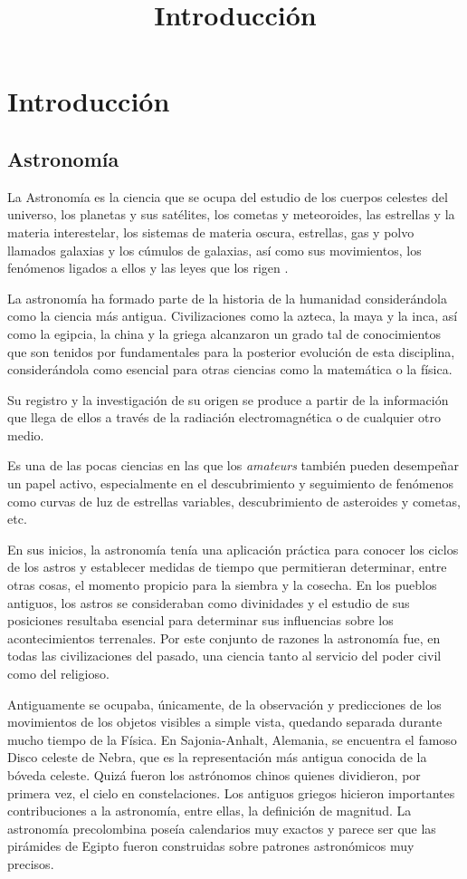 \chapter{Introducción}
\title{Introducción}
\label{cap:Introduccion}


\section{Astronomía}
La Astronomía es la ciencia que se ocupa del estudio de los cuerpos celestes del universo, los planetas y sus satélites, los cometas y meteoroides, las estrellas y la materia interestelar, los sistemas de materia oscura, estrellas, gas y polvo llamados galaxias y los cúmulos de galaxias, así como sus movimientos, los fenómenos ligados a ellos y las leyes que los rigen \cite{Astronomia1}.

La astronomía ha formado parte de la historia de la humanidad considerándola como la ciencia más antigua. Civilizaciones como la azteca, la maya y la inca, así como la egipcia, la china y la griega alcanzaron un grado tal de conocimientos que son tenidos por fundamentales para la posterior evolución de esta disciplina, considerándola como esencial para otras ciencias como la matemática o la física.

Su registro y la investigación de su origen se produce a partir de la información que llega de ellos a través de la radiación electromagnética o de cualquier otro medio.

Es una de las pocas ciencias en las que los \textit{amateurs} también pueden desempeñar un papel activo, especialmente en el descubrimiento y seguimiento de fenómenos como curvas de luz de estrellas variables, descubrimiento de asteroides y cometas, etc.

En sus inicios, la astronomía tenía una aplicación práctica para conocer los ciclos de los astros y establecer medidas de tiempo que permitieran determinar, entre otras cosas, el momento propicio para la siembra y la cosecha. En los pueblos antiguos, los astros se consideraban como divinidades y el estudio de sus posiciones resultaba esencial para determinar sus influencias sobre los acontecimientos terrenales. Por este conjunto de razones la astronomía fue, en todas las civilizaciones del pasado, una ciencia tanto al servicio del poder civil como del religioso.

Antiguamente se ocupaba, únicamente, de la observación y predicciones de los movimientos de los objetos visibles a simple vista, quedando separada durante mucho tiempo de la Física. En Sajonia-Anhalt, Alemania, se encuentra el famoso Disco celeste de Nebra, que es la representación más antigua conocida de la bóveda celeste. Quizá fueron los astrónomos chinos quienes dividieron, por primera vez, el cielo en constelaciones. Los antiguos griegos hicieron importantes contribuciones a la astronomía, entre ellas, la definición de magnitud. La astronomía precolombina poseía calendarios muy exactos y parece ser que las pirámides de Egipto fueron construidas sobre patrones astronómicos muy precisos.

